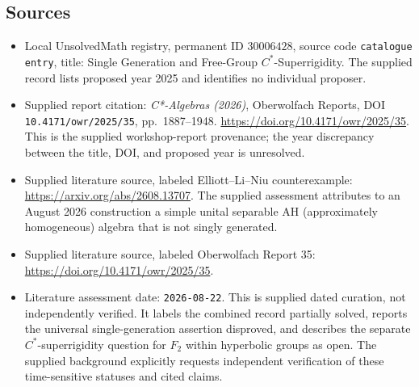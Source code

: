 \documentclass[11pt]{article}
\begin{document}
\subsection{Sources}
\begin{itemize}
\item Local UnsolvedMath registry, permanent ID \(30006428\), source code \texttt{catalogue entry}, title: Single Generation and Free-Group \(C^*\)-Superrigidity. The supplied record lists proposed year 2025 and identifies no individual proposer.
\item Supplied report citation: \emph{C*-Algebras (2026)}, Oberwolfach Reports, DOI \texttt{10.4171/owr/2025/35}, pp.\ 1887--1948. \url{https://doi.org/10.4171/owr/2025/35}. This is the supplied workshop-report provenance; the year discrepancy between the title, DOI, and proposed year is unresolved.
\item Supplied literature source, labeled Elliott--Li--Niu counterexample: \url{https://arxiv.org/abs/2608.13707}. The supplied assessment attributes to an August 2026 construction a simple unital separable AH (approximately homogeneous) algebra that is not singly generated.
\item Supplied literature source, labeled Oberwolfach Report 35: \url{https://doi.org/10.4171/owr/2025/35}.
\item Literature assessment date: \texttt{2026-08-22}. This is supplied dated curation, not independently verified. It labels the combined record partially solved, reports the universal single-generation assertion disproved, and describes the separate \(C^*\)-superrigidity question for \(F_2\) within hyperbolic groups as open. The supplied background explicitly requests independent verification of these time-sensitive statuses and cited claims.
\end{itemize}
\end{document}
